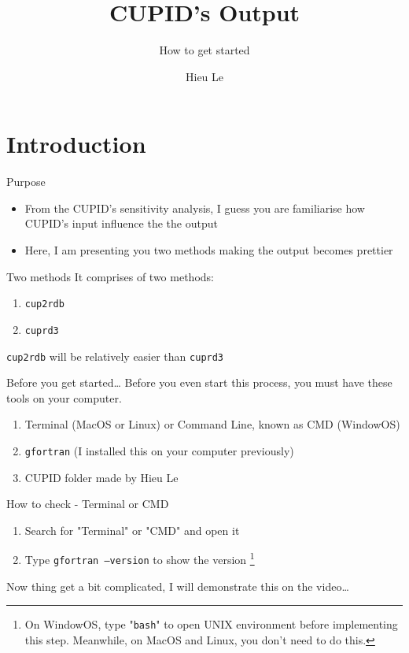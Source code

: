 \documentclass{beamer}
\title[CUPID 101]
{CUPID's Output}
\subtitle{How to get started}
\author{Hieu Le}
\institute{UofA}
\begin{document}
\frame{\titlepage}



\section{Introduction}
\begin{frame}{Purpose}
	\begin{itemize}
	\item From the CUPID's sensitivity analysis, I guess you are familiarise how CUPID's input influence the the output
	\item Here, I am presenting you two methods making the output becomes prettier
	\end{itemize}
\end{frame}

\begin{frame}{Two methods}
	It comprises of two methods:
		\begin{enumerate}
			\item \texttt{cup2rdb}
			\item \texttt{cuprd3}
		\end{enumerate}
	\texttt{cup2rdb} will be relatively easier than \texttt{cuprd3}
\end{frame}

\begin{frame}{Before you get started\ldots}
	Before you even start this process, you must have these tools on your computer.
	\begin{enumerate}
		\item Terminal (MacOS or Linux) or Command Line, known as CMD (WindowOS)
		\item \texttt{gfortran} (I installed this on your computer previously)
		\item CUPID folder made by Hieu Le
	\end{enumerate}
\end{frame}

\begin{frame}{How to check - Terminal or CMD}
	\begin{enumerate}
		\item Search for "Terminal" or "CMD" and open it
		\item Type \texttt{gfortran --version} to show the version
		\footnote{On WindowOS, type "\texttt{bash}" to open UNIX environment before implementing this step. Meanwhile, on MacOS and Linux, you don't need to do this.}
	\end{enumerate}
	Now thing get a bit complicated, I will demonstrate this on the video\ldots
\end{frame}
\end{document}
